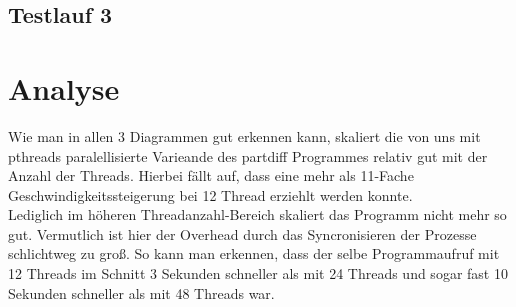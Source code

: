 \documentclass{scrartcl}
\begin{document}
\subsection{Testlauf 3}
\section{Analyse}
Wie man in allen 3 Diagrammen gut erkennen kann, skaliert die von uns mit pthreads paralellisierte Varieande des partdiff Programmes relativ gut mit der Anzahl der Threads. Hierbei fällt auf, dass eine mehr als 11-Fache Geschwindigkeitssteigerung bei 12 Thread erziehlt werden konnte.\\
Lediglich im höheren Threadanzahl-Bereich skaliert das Programm nicht mehr so gut. Vermutlich ist hier der Overhead durch das Syncronisieren der Prozesse schlichtweg zu groß. So kann man erkennen, dass der selbe Programmaufruf mit 12 Threads im Schnitt 3 Sekunden schneller als mit 24 Threads und sogar fast 10 Sekunden schneller als mit 48 Threads war.
\end{document}

